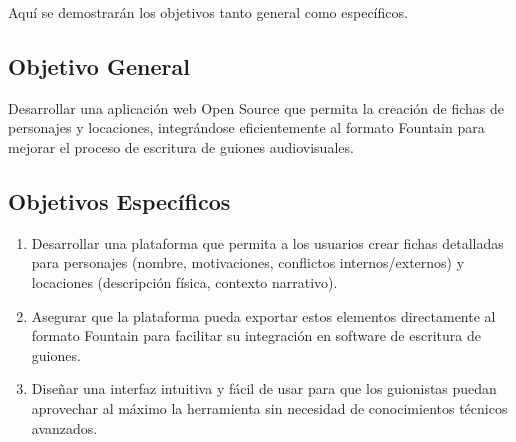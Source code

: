 \documentclass[12pt]{article}
\begin{document}
	Aquí se demostrarán los objetivos tanto general como específicos.

	\subsection*{Objetivo General}
	Desarrollar una aplicación web Open Source que permita la creación de fichas de personajes y locaciones, integrándose eficientemente al formato Fountain para mejorar el proceso de escritura de guiones audiovisuales.

	\subsection*{Objetivos Específicos}
	\begin{enumerate}
		\item Desarrollar una plataforma que permita a los usuarios crear fichas detalladas para personajes (nombre, motivaciones, conflictos internos/externos) y locaciones (descripción física, contexto narrativo).
		\item Asegurar que la plataforma pueda exportar estos elementos directamente al formato Fountain para facilitar su integración en software de escritura de guiones.
		\item Diseñar una interfaz intuitiva y fácil de usar para que los guionistas puedan aprovechar al máximo la herramienta sin necesidad de conocimientos técnicos avanzados.
	\end{enumerate}
\end{document}
